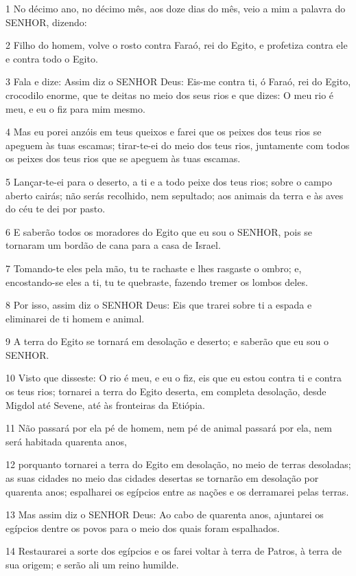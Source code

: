 \par 1 No décimo ano, no décimo mês, aos doze dias do mês, veio a mim a palavra do SENHOR, dizendo:
\par 2 Filho do homem, volve o rosto contra Faraó, rei do Egito, e profetiza contra ele e contra todo o Egito.
\par 3 Fala e dize: Assim diz o SENHOR Deus: Eis-me contra ti, ó Faraó, rei do Egito, crocodilo enorme, que te deitas no meio dos seus rios e que dizes: O meu rio é meu, e eu o fiz para mim mesmo.
\par 4 Mas eu porei anzóis em teus queixos e farei que os peixes dos teus rios se apeguem às tuas escamas; tirar-te-ei do meio dos teus rios, juntamente com todos os peixes dos teus rios que se apeguem às tuas escamas.
\par 5 Lançar-te-ei para o deserto, a ti e a todo peixe dos teus rios; sobre o campo aberto cairás; não serás recolhido, nem sepultado; aos animais da terra e às aves do céu te dei por pasto.
\par 6 E saberão todos os moradores do Egito que eu sou o SENHOR, pois se tornaram um bordão de cana para a casa de Israel.
\par 7 Tomando-te eles pela mão, tu te rachaste e lhes rasgaste o ombro; e, encostando-se eles a ti, tu te quebraste, fazendo tremer os lombos deles.
\par 8 Por isso, assim diz o SENHOR Deus: Eis que trarei sobre ti a espada e eliminarei de ti homem e animal.
\par 9 A terra do Egito se tornará em desolação e deserto; e saberão que eu sou o SENHOR.
\par 10 Visto que disseste: O rio é meu, e eu o fiz, eis que eu estou contra ti e contra os teus rios; tornarei a terra do Egito deserta, em completa desolação, desde Migdol até Sevene, até às fronteiras da Etiópia.
\par 11 Não passará por ela pé de homem, nem pé de animal passará por ela, nem será habitada quarenta anos,
\par 12 porquanto tornarei a terra do Egito em desolação, no meio de terras desoladas; as suas cidades no meio das cidades desertas se tornarão em desolação por quarenta anos; espalharei os egípcios entre as nações e os derramarei pelas terras.
\par 13 Mas assim diz o SENHOR Deus: Ao cabo de quarenta anos, ajuntarei os egípcios dentre os povos para o meio dos quais foram espalhados.
\par 14 Restaurarei a sorte dos egípcios e os farei voltar à terra de Patros, à terra de sua origem; e serão ali um reino humilde.
